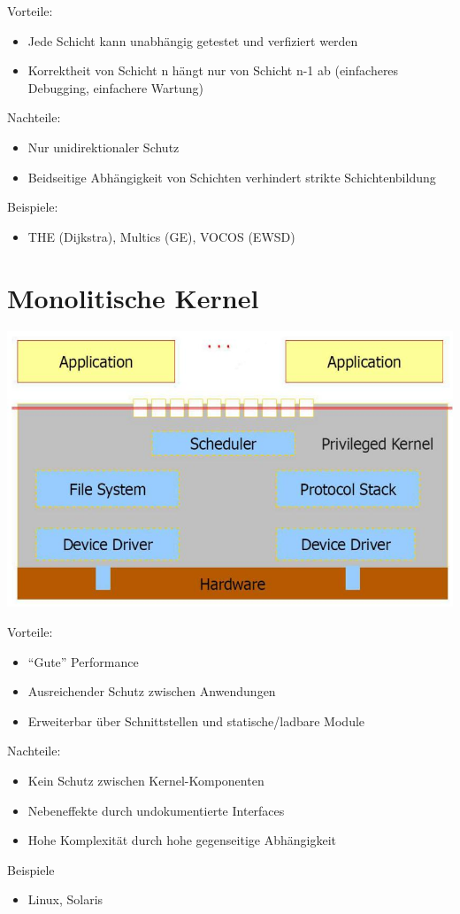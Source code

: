 \documentclass[a4paper]{scrreprt}
\begin{document}
Vorteile:
	\begin{itemize}
		\item Jede Schicht kann unabhängig getestet und verfiziert werden
		\item Korrektheit von Schicht n hängt nur von Schicht n-1 ab (einfacheres Debugging, einfachere Wartung)
	\end{itemize}

Nachteile:
	\begin{itemize}
		\item Nur unidirektionaler Schutz
		\item Beidseitige Abhängigkeit von Schichten verhindert strikte Schichtenbildung
	\end{itemize}
Beispiele:
	\begin{itemize}
		\item THE (Dijkstra), Multics (GE), VOCOS (EWSD)
	\end{itemize}
	
\section{Monolitische Kernel}
	\begin{center}
		\includegraphics[scale=0.3]{graphics/monolithickernel.png}
	\end{center}
	Vorteile:
		\begin{itemize}
			\item "`Gute"' Performance
			\item Ausreichender Schutz zwischen Anwendungen
			\item Erweiterbar über Schnittstellen und statische/ladbare Module
		\end{itemize}
	Nachteile:
		\begin{itemize}
			\item Kein Schutz zwischen Kernel-Komponenten
			\item Nebeneffekte durch undokumentierte Interfaces
			\item Hohe Komplexität durch hohe gegenseitige Abhängigkeit
		\end{itemize}
	Beispiele
		\begin{itemize}
			\item Linux, Solaris
		\end{itemize}
\end{document}
